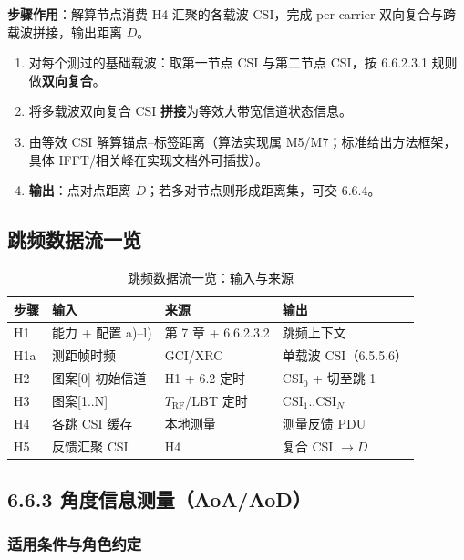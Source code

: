 \documentclass[11pt,a4paper]{ctexart}
\begin{document}
\textbf{步骤作用}：解算节点消费 H4 汇聚的各载波 CSI，完成 per-carrier 双向复合与跨载波拼接，输出距离 $D$。

\begin{enumerate}
  \item 对每个测过的基础载波：取第一节点 CSI 与第二节点 CSI，按 6.6.2.3.1 规则做\textbf{双向复合}。
  \item 将多载波双向复合 CSI \textbf{拼接}为等效大带宽信道状态信息。
  \item 由等效 CSI 解算锚点--标签距离（算法实现属 M5/M7；标准给出方法框架，具体 IFFT/相关峰在实现文档外可插拔）。
  \item \textbf{输出}：点对点距离 $D$；若多对节点则形成距离集，可交 6.6.4。
\end{enumerate}

\subsection{跳频数据流一览}

\begin{longtable}{llll}
\caption{跳频数据流一览：输入与来源\label{tab:step113}} \\
\toprule
\textbf{步骤} & \textbf{输入} & \textbf{来源} & \textbf{输出} \\
\midrule
H1 & 能力 + 配置 a)--l) & 第 7 章 + 6.6.2.3.2 & 跳频上下文 \\
H1a & 测距帧时频 & GCI/XRC & 单载波 CSI（6.5.5.6） \\
H2 & 图案[0] 初始信道 & H1 + 6.2 定时 & CSI$_0$ + 切至跳 1 \\
H3 & 图案[1..N] & $T_{\mathrm{RF}}$/LBT 定时 & CSI$_1$..CSI$_N$ \\
H4 & 各跳 CSI 缓存 & 本地测量 & 测量反馈 PDU \\
H5 & 反馈汇聚 CSI & H4 & 复合 CSI $\rightarrow D$ \\
\bottomrule
\end{longtable}



\subsection{6.6.3 角度信息测量（AoA/AoD）}


\label{sec:aoa}

\subsubsection{适用条件与角色约定}
\end{document}
